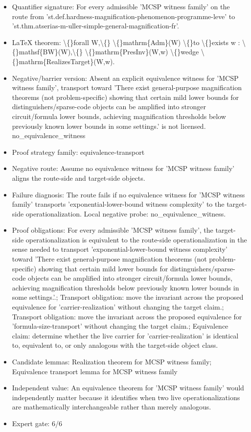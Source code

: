 \documentclass[11pt]{article}
\begin{document}
\begin{itemize}
\item Quantifier signature: For every admissible 'MCSP witness family' on the route from 'st.def.hardness-magnification-phenomenon-programme-leve' to 'st.thm.atserias-m-uller-simple-general-magnification-fr'.
\item LaTeX theorem: \textbackslash\{\}forall W,\textbackslash\{\} \textbackslash\{\}mathrm\{Adm\}(W) \textbackslash\{\}to \textbackslash\{\}exists w : \textbackslash\{\}mathsf\{BW\}(W),\textbackslash\{\} \textbackslash\{\}mathrm\{PresInv\}(W,w) \textbackslash\{\}wedge \textbackslash\{\}mathrm\{RealizesTarget\}(W,w).
\item Negative/barrier version: Absent an explicit equivalence witness for 'MCSP witness family', transport toward 'There exist general-purpose magnification theorems (not problem-specific) showing that certain mild lower bounds for distinguishers/sparse-code objects can be amplified into stronger circuit/formula lower bounds, achieving magnification thresholds below previously known lower bounds in some settings.' is not licensed. no\_equivalence\_witness
\item Proof strategy family: equivalence-transport
\item Negative route: Assume no equivalence witness for 'MCSP witness family' aligns the route-side and target-side objects.
\item Failure diagnosis: The route fails if no equivalence witness for 'MCSP witness family' transports 'exponential-lower-bound witness complexity' to the target-side operationalization. Local negative probe: no\_equivalence\_witness.
\item Proof obligations: For every admissible 'MCSP witness family', the target-side operationalization is equivalent to the route-side operationalization in the sense needed to transport 'exponential-lower-bound witness complexity' toward 'There exist general-purpose magnification theorems (not problem-specific) showing that certain mild lower bounds for distinguishers/sparse-code objects can be amplified into stronger circuit/formula lower bounds, achieving magnification thresholds below previously known lower bounds in some settings.'.; Transport obligation: move the invariant across the proposed equivalence for 'carrier-realization' without changing the target claim.; Transport obligation: move the invariant across the proposed equivalence for 'formula-size-transport' without changing the target claim.; Equivalence claim: determine whether the live carrier for 'carrier-realization' is identical to, equivalent to, or only analogous with the target-side object class.
\item Candidate lemmas: Realization theorem for MCSP witness family; Equivalence transport lemma for MCSP witness family
\item Independent value: An equivalence theorem for 'MCSP witness family' would independently matter because it identifies when two live operationalizations are mathematically interchangeable rather than merely analogous.
\item Expert gate: 6/6
\end{itemize}
\end{document}
